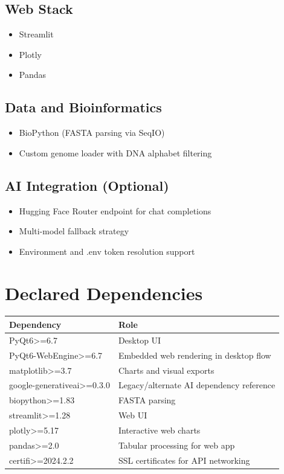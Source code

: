 \documentclass[11pt]{article}
\begin{document}
\subsection{Web Stack}
\begin{itemize}[leftmargin=*]
  \item Streamlit
  \item Plotly
  \item Pandas
\end{itemize}

\subsection{Data and Bioinformatics}
\begin{itemize}[leftmargin=*]
  \item BioPython (FASTA parsing via SeqIO)
  \item Custom genome loader with DNA alphabet filtering
\end{itemize}

\subsection{AI Integration (Optional)}
\begin{itemize}[leftmargin=*]
  \item Hugging Face Router endpoint for chat completions
  \item Multi-model fallback strategy
  \item Environment and .env token resolution support
\end{itemize}

\section{Declared Dependencies}
\begin{longtable}{|p{}|p{}|}
\hline
\textbf{Dependency} & \textbf{Role} \\
\hline
PyQt6>=6.7 & Desktop UI \\
\hline
PyQt6-WebEngine>=6.7 & Embedded web rendering in desktop flow \\
\hline
matplotlib>=3.7 & Charts and visual exports \\
\hline
google-generativeai>=0.3.0 & Legacy/alternate AI dependency reference \\
\hline
biopython>=1.83 & FASTA parsing \\
\hline
streamlit>=1.28 & Web UI \\
\hline
plotly>=5.17 & Interactive web charts \\
\hline
pandas>=2.0 & Tabular processing for web app \\
\hline
certifi>=2024.2.2 & SSL certificates for API networking \\
\hline
\end{longtable}
\end{document}
